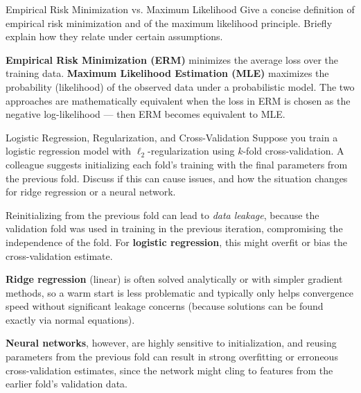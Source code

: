 \documentclass{article}
\begin{document}
\begin{exercise}{Empirical Risk Minimization vs. Maximum Likelihood}
  Give a concise definition of empirical risk minimization and of the maximum likelihood principle. Briefly explain how they relate under certain assumptions.

  \begin{solution}
    \textbf{Empirical Risk Minimization (ERM)} minimizes the average loss over the training data.  
    \textbf{Maximum Likelihood Estimation (MLE)} maximizes the probability (likelihood) of the observed data under a probabilistic model.
    The two approaches are mathematically equivalent when the loss in ERM is chosen as the negative log-likelihood — then ERM becomes equivalent to MLE.
  \end{solution}
\end{exercise}

\begin{exercise}{Logistic Regression, Regularization, and Cross-Validation}
  Suppose you train a logistic regression model with $\ell_2$-regularization using $k$-fold cross-validation. A colleague suggests initializing each fold's training with the final parameters from the previous fold. Discuss if this can cause issues, and how the situation changes for ridge regression or a neural network.

  \begin{solution}
    Reinitializing from the previous fold can lead to \emph{data leakage}, because the validation fold was used in training in the previous iteration, compromising the independence of the fold. For \textbf{logistic regression}, this might overfit or bias the cross-validation estimate.  

    \textbf{Ridge regression} (linear) is often solved analytically or with simpler gradient methods, so a warm start is less problematic and typically only helps convergence speed without significant leakage concerns (because solutions can be found exactly via normal equations).  

    \textbf{Neural networks}, however, are highly sensitive to initialization, and reusing parameters from the previous fold can result in strong overfitting or erroneous cross-validation estimates, since the network might cling to features from the earlier fold’s validation data.
  \end{solution}
\end{exercise}
\end{document}
